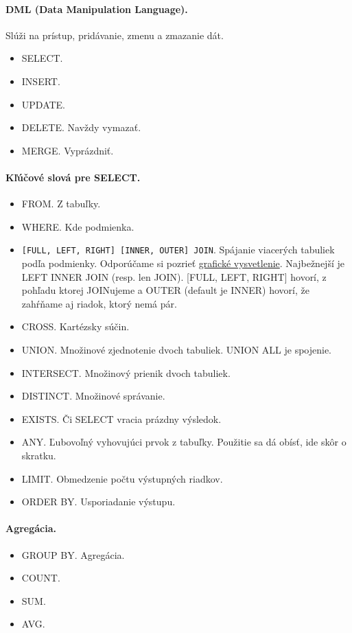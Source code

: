 \documentclass[10pt,a4paper]{article}
\begin{document}
\paragraph{DML (Data Manipulation Language).}
Slúži na prístup, pridávanie, zmenu a zmazanie dát. 

\begin{itemize}
\item SELECT. 
\item INSERT. 
\item UPDATE.
\item DELETE. Navždy vymazať. 
\item MERGE. Vyprázdniť. 
\end{itemize}

\paragraph{Kľúčové slová pre SELECT.}
\begin{itemize}
\item FROM. Z tabuľky.  
\item WHERE. Kde podmienka. 
\item \verb|[FULL, LEFT, RIGHT] [INNER, OUTER] JOIN|. Spájanie viacerých tabuliek podľa podmienky. Odporúčame si pozrieť \href{http://www.codinghorror.com/blog/2007/10/a-visual-explanation-of-sql-joins.html}{grafické vysvetlenie}. Najbežnejší je LEFT INNER JOIN (resp. len JOIN). [FULL, LEFT, RIGHT] hovorí, z pohľadu ktorej JOINujeme a OUTER (default je INNER) hovorí, že zahŕňame aj riadok, ktorý nemá pár. 
\item CROSS. Kartézsky súčin. 
\item UNION. Množinové zjednotenie dvoch tabuliek. UNION ALL je spojenie.
\item INTERSECT. Množinový prienik dvoch tabuliek. 
\item DISTINCT. Množinové správanie.    
\item EXISTS. Či SELECT vracia prázdny výsledok. 
\item ANY. Ľubovoľný vyhovujúci prvok z tabuľky. Použitie sa dá obísť, ide skôr o skratku. 
\item LIMIT. Obmedzenie počtu výstupných riadkov.
\item ORDER BY. Usporiadanie výstupu.
\end{itemize}

\paragraph{Agregácia.}
\begin{itemize}
\item GROUP BY. Agregácia.  
\item COUNT.
\item SUM.
\item AVG. 
\end{itemize}
\end{document}
